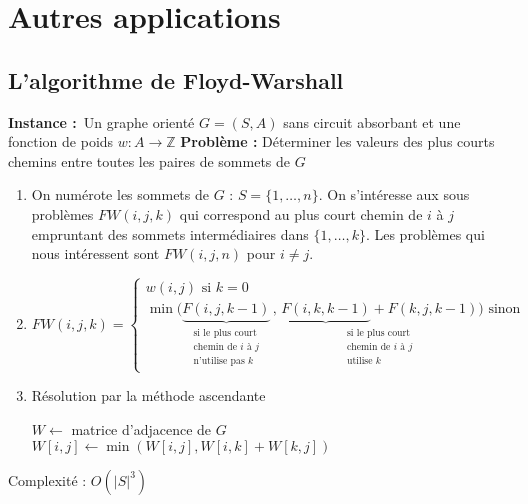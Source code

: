 \section{Autres applications}

\subsection{L'algorithme de Floyd-Warshall}
\textbf{Instance :} Un graphe orienté $G = (S, A)$ sans circuit absorbant et une fonction de poids $w : A \to \mathbb Z$
\textbf{Problème :} Déterminer les valeurs des plus courts chemins entre toutes les paires de sommets de $G$

\begin{algo}
	\begin{enumerate}
		\item On numérote les sommets de $G$ : $S = \{1, \dots, n\}$. On s'intéresse aux sous problèmes $FW(i,j,k)$ qui correspond au plus court chemin de $i$ à $j$ empruntant des sommets intermédiaires dans $\{1, \dots, k\}$. Les problèmes qui nous intéressent sont $FW(i,j,n)$ pour $i \neq j$.
		\item $FW(i, j, k) = \left\{ \begin{array}{l}
			w(i,j) \text{ si } k = 0\\
			\min \Big( \underset{\substack{\text{si le plus court}\\\text{chemin de $i$ à $j$}\\\text{n'utilise pas } k}}{\underbrace{F(i,j, k-1)}} \, , \, \underset{\substack{\text{si le plus court}\\\text{chemin de $i$ à $j$}\\\text{utilise } k}}{\underbrace{F(i,k, k-1)} + F(k, j, k-1)} \Big) \text{ sinon}
		\end{array}\right.$
		\item Résolution par la méthode ascendante\\
		\begin{algorithm}[H]
			\caption{$Floyd-Warshall(G)$}
			$W \gets$ matrice d'adjacence de $G$\\
			{
					{
							{
								$W[i,j] \gets \min (W[i,j], W[i,k] + W[k,j])$
							}
					}
			}
		\end{algorithm}
	\end{enumerate}
	Complexité : $O(|S|^3)$
\end{algo}

